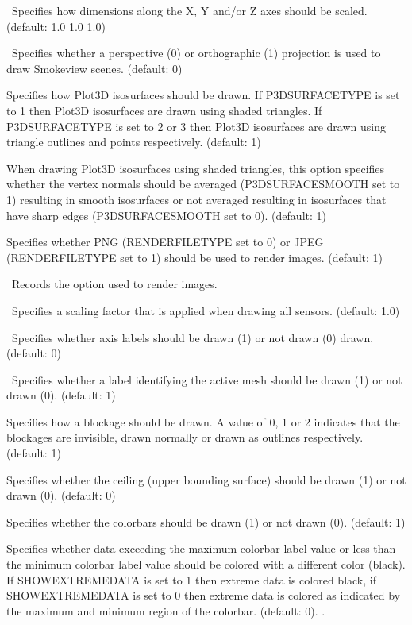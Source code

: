 \documentclass[11pt,twoside]{book}
\begin{document}
\ Specifies how dimensions along the X, Y
and/or Z axes should be scaled. (default: 1.0 1.0 1.0)

\ Specifies whether a perspective (0) or orthographic (1) projection
is used to draw Smokeview scenes.
(default: 0)

Specifies how Plot3D isosurfaces should be
drawn.  If P3DSURFACETYPE is set to 1 then Plot3D isosurfaces are
drawn using shaded triangles.  If P3DSURFACETYPE is set to 2 or 3
then Plot3D isosurfaces are drawn using triangle outlines and
points respectively. (default: 1)

When drawing Plot3D isosurfaces using
shaded triangles, this option specifies whether the vertex normals
should be averaged (P3DSURFACESMOOTH set to 1) resulting in smooth
isosurfaces or not averaged resulting in isosurfaces that have
sharp edges (P3DSURFACESMOOTH set to 0). (default: 1)

Specifies whether PNG (RENDERFILETYPE set to 0) or
JPEG (RENDERFILETYPE set to 1)
should be used to render images.  (default: 1)

\ Records the option used to render images.

\ Specifies a scaling factor that is applied when
drawing all sensors.  (default: 1.0)

\ Specifies whether axis labels should
be drawn (1) or not drawn (0) drawn. (default: 0)

\ Specifies whether a label identifying the
active mesh should be drawn (1) or not drawn (0). (default: 1)

Specifies how a blockage should
be drawn.  A value of 0, 1 or 2 indicates that the blockages are
invisible, drawn normally or drawn as outlines respectively.  (default: 1)

Specifies whether
the ceiling (upper bounding surface) should be drawn (1) or not drawn (0).
(default: 0)


Specifies whether
the colorbars should be drawn (1) or not drawn (0).
(default: 1)

Specifies whether data exceeding the maximum colorbar
label value or less than the minimum colorbar label value should be colored
with a different color (black).  If SHOWEXTREMEDATA is set to 1 then extreme
data is colored black, if SHOWEXTREMEDATA is set to 0 then extreme data is
colored as indicated by the maximum and minimum region of the colorbar. (default: 0).  .
\end{document}
